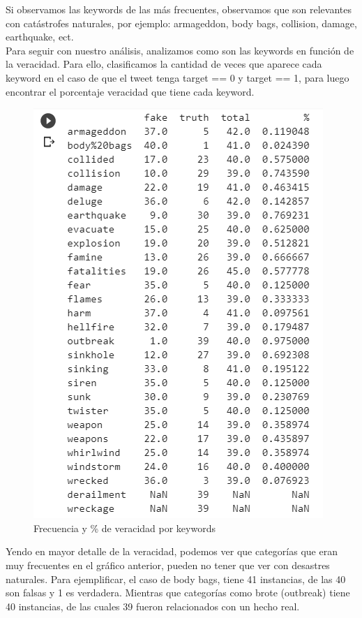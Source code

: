 \documentclass[]{article}
\begin{document}
Si observamos las keywords de las m\'as frecuentes, observamos que son relevantes con cat\'astrofes naturales, por ejemplo: armageddon, body bags, collision, damage, earthquake, ect. \\


Para seguir con nuestro an\'alisis, analizamos como son las keywords en funci\'on de la veracidad. Para ello, clasificamos la cantidad de veces que aparece cada keyword en el caso de que el tweet tenga target == 0 y target == 1, para luego encontrar el porcentaje veracidad que tiene cada keyword. 

 \begin{figure}[H]
	
	\includegraphics[width=1.20\linewidth]{keyword2}
	\caption[]{Frecuencia y \% de veracidad por keywords}
\end{figure}

Yendo en mayor detalle de la veracidad, podemos ver que categor\'ias que eran muy frecuentes en el gr\'afico anterior, pueden no tener que ver con desastres naturales. Para ejemplificar, el caso de body bags, tiene 41 instancias, de las 40 son falsas y 1 es verdadera. Mientras que categor\'ias como brote (outbreak) tiene 40 instancias, de las cuales 39 fueron relacionados con un hecho real.\\
\end{document}
